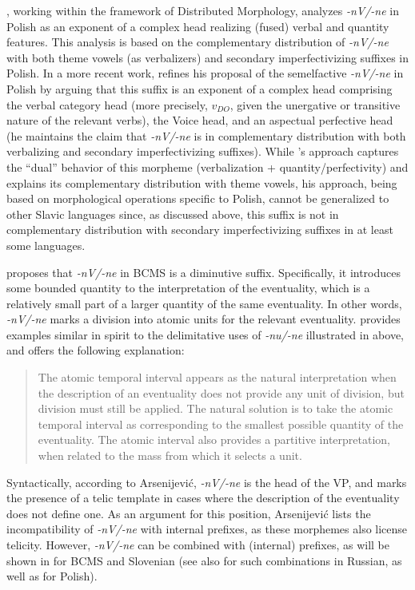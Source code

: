 \documentclass[output=paper,colorlinks,citecolor=brown]{langscibook}
\begin{document}
\citet{Kwapiszewski2020}, working within the framework of Distributed Morphology, analyzes \textit{-nV/-ne} in Polish as an exponent of a complex head realizing (fused) verbal and quantity features. This analysis is based on the complementary distribution of \textit{-nV/-ne} with both theme vowels (as verbalizers) and secondary imperfectivizing suffixes in Polish. In a more recent work, \citet[231--237]{Kwapiszewski2022} refines his proposal of the semelfactive \textit{-nV/-ne} in Polish by arguing that this suffix is an exponent of a complex head comprising the verbal category head (more precisely, $v_{DO}$, given the unergative or transitive nature of the relevant verbs), the Voice head, and an aspectual perfective head (he maintains the claim that \textit{-nV/-ne} is in complementary distribution with both verbalizing and secondary imperfectivizing suffixes). While \citeauthor{Kwapiszewski2022}'s approach captures the ``dual'' behavior of this morpheme (verbalization + quantity/perfectivity) and explains its complementary distribution with theme vowels, his approach, being based on morphological operations specific to Polish, cannot be generalized to other Slavic languages since, as discussed above, this suffix is not in complementary distribution with secondary imperfectivizing suffixes in at least some languages. 

\citet{Arsenijevic2006} proposes that \textit{-nV/-ne} in BCMS is a diminutive suffix. Specifically, it introduces some bounded quantity to the interpretation of the eventuality, which is a relatively small part of a larger quantity of the same eventuality. In other words, \textit{-nV/-ne} marks a division into atomic units for the relevant eventuality. \citeauthor{Arsenijevic2006} provides examples similar in spirit to the delimitative uses of \textit{-nu/-ne} illustrated in  above, and offers the following explanation: \begin{quote}
    The atomic temporal interval appears as the natural interpretation when the description of an eventuality does not provide any unit of division, but division must still be applied. The natural solution is to take the atomic temporal interval as corresponding to the smallest possible quantity of the eventuality. The atomic interval also provides a partitive interpretation, when related to the mass from which it selects a unit. \citep[219]{Arsenijevic2006}
\end{quote}

Syntactically, according to Arsenijević, \textit{-nV/-ne} is the head of the VP, and marks the presence of a telic template in cases where the description of the eventuality does not define one. As an argument for this position, Arsenijević lists the incompatibility of \textit{-nV/-ne} with internal prefixes, as these morphemes also license telicity. However, \textit{-nV/-ne} can be combined with (internal) prefixes, as will be shown in  for BCMS and Slovenian (see also \citealt{Nordrum2019} for such combinations in Russian, as well as \citealt{Kwapiszewski2020} for Polish).  
\end{document}
